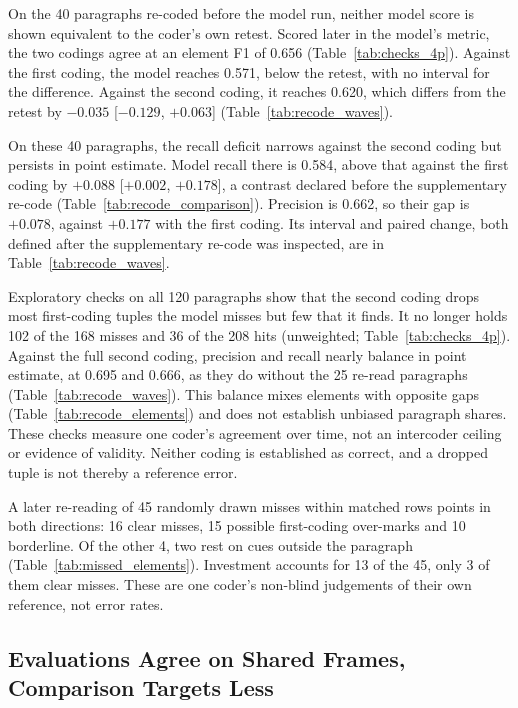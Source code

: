 On the 40 paragraphs re-coded before the model run, neither model score is shown equivalent to the coder's own retest. Scored later in the model's metric, the two codings agree at an element F1 of 0.656 (Table~\ref{tab:checks_4p}). Against the first coding, the model reaches 0.571, below the retest, with no interval for the difference. Against the second coding, it reaches 0.620, which differs from the retest by $-0.035$ [$-0.129$, $+0.063$] (Table~\ref{tab:recode_waves}).

On these 40 paragraphs, the recall deficit narrows against the second coding but persists in point estimate. Model recall there is 0.584, above that against the first coding by $+0.088$ [$+0.002$, $+0.178$], a contrast declared before the supplementary re-code (Table~\ref{tab:recode_comparison}). Precision is 0.662, so their gap is $+0.078$, against $+0.177$ with the first coding. Its interval and paired change, both defined after the supplementary re-code was inspected, are in Table~\ref{tab:recode_waves}.

Exploratory checks on all 120 paragraphs show that the second coding drops most first-coding tuples the model misses but few that it finds. It no longer holds 102 of the 168 misses and 36 of the 208 hits (unweighted; Table~\ref{tab:checks_4p}). Against the full second coding, precision and recall nearly balance in point estimate, at 0.695 and 0.666, as they do without the 25 re-read paragraphs (Table~\ref{tab:recode_waves}). This balance mixes elements with opposite gaps (Table~\ref{tab:recode_elements}) and does not establish unbiased paragraph shares. These checks measure one coder's agreement over time, not an intercoder ceiling or evidence of validity. Neither coding is established as correct, and a dropped tuple is not thereby a reference error.

\label{subsec:missed_results}%
A later re-reading of 45 randomly drawn misses within matched rows points in both directions: 16 clear misses, 15 possible first-coding over-marks and 10 borderline. Of the other 4, two rest on cues outside the paragraph (Table~\ref{tab:missed_elements}). Investment accounts for 13 of the 45, only 3 of them clear misses. These are one coder's non-blind judgements of their own reference, not error rates.

\subsection{Evaluations Agree on Shared Frames, Comparison Targets Less}\label{subsubsec:categorical}

